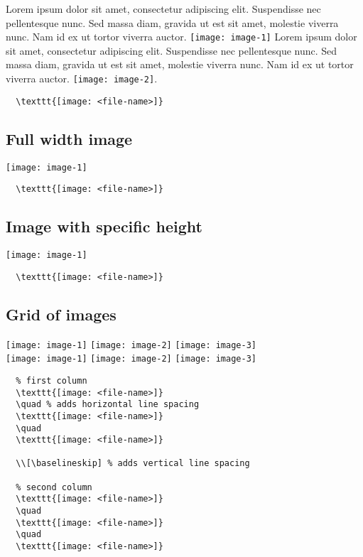 Lorem ipsum dolor sit amet, consectetur adipiscing elit. Suspendisse nec pellentesque nunc. Sed massa diam, gravida ut est sit amet, molestie viverra nunc. Nam id ex ut tortor viverra auctor. \texttt{[image: image-1]} Lorem ipsum dolor sit amet, consectetur adipiscing elit. Suspendisse nec pellentesque nunc. Sed massa diam, gravida ut est sit amet, molestie viverra nunc. Nam id ex ut tortor viverra auctor. \texttt{[image: image-2]}.

\begin{lstlisting}
  \texttt{[image: <file-name>]}
\end{lstlisting}

\clearpage
\subsection{Full width image}

\texttt{[image: image-1]}

\begin{lstlisting}
  \texttt{[image: <file-name>]}
\end{lstlisting}

\clearpage
\subsection{Image with specific height}

\texttt{[image: image-1]}

\begin{lstlisting}
  \texttt{[image: <file-name>]}
\end{lstlisting}

\clearpage
\subsection{Grid of images}

\texttt{[image: image-1]}
\quad
\texttt{[image: image-2]}
\quad
\texttt{[image: image-3]}
\\[\baselineskip]%
\texttt{[image: image-1]}
\quad
\texttt{[image: image-2]}
\quad
\texttt{[image: image-3]}

\begin{lstlisting}
  % first column
  \texttt{[image: <file-name>]}
  \quad % adds horizontal line spacing
  \texttt{[image: <file-name>]}
  \quad
  \texttt{[image: <file-name>]}

  \\[\baselineskip] % adds vertical line spacing

  % second column
  \texttt{[image: <file-name>]}
  \quad
  \texttt{[image: <file-name>]}
  \quad
  \texttt{[image: <file-name>]}
\end{lstlisting}

